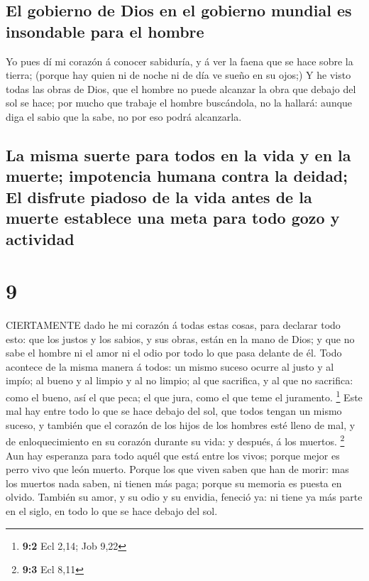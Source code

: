 \hypertarget{el-gobierno-de-dios-en-el-gobierno-mundial-es-insondable-para-el-hombre}{%
\subsection{El gobierno de Dios en el gobierno mundial es insondable
para el
hombre}\label{el-gobierno-de-dios-en-el-gobierno-mundial-es-insondable-para-el-hombre}}

 Yo pues dí mi corazón á conocer sabiduría, y á ver la
faena que se hace sobre la tierra; (porque hay quien ni de noche ni de
día ve sueño en su ojos;)  Y he visto todas las obras de
Dios, que el hombre no puede alcanzar la obra que debajo del sol se
hace; por mucho que trabaje el hombre buscándola, no la hallará: aunque
diga el sabio que la sabe, no por eso podrá alcanzarla.

\hypertarget{la-misma-suerte-para-todos-en-la-vida-y-en-la-muerte-impotencia-humana-contra-la-deidad-el-disfrute-piadoso-de-la-vida-antes-de-la-muerte-establece-una-meta-para-todo-gozo-y-actividad}{%
\subsection{La misma suerte para todos en la vida y en la muerte;
impotencia humana contra la deidad; El disfrute piadoso de la vida antes
de la muerte establece una meta para todo gozo y
actividad}\label{la-misma-suerte-para-todos-en-la-vida-y-en-la-muerte-impotencia-humana-contra-la-deidad-el-disfrute-piadoso-de-la-vida-antes-de-la-muerte-establece-una-meta-para-todo-gozo-y-actividad}}

\hypertarget{section-8}{%
\section{9}\label{section-8}}

 CIERTAMENTE dado he mi corazón á todas estas cosas, para
declarar todo esto: que los justos y los sabios, y sus obras, están en
la mano de Dios; y que no sabe el hombre ni el amor ni el odio por todo
lo que pasa delante de él.  Todo acontece de la misma manera
á todos: un mismo suceso ocurre al justo y al impío; al bueno y al
limpio y al no limpio; al que sacrifica, y al que no sacrifica: como el
bueno, así el que peca; el que jura, como el que teme el juramento.
\footnote{\textbf{9:2} Ecl 2,14; Job 9,22}  Este mal hay
entre todo lo que se hace debajo del sol, que todos tengan un mismo
suceso, y también que el corazón de los hijos de los hombres esté lleno
de mal, y de enloquecimiento en su corazón durante su vida: y después, á
los muertos. \footnote{\textbf{9:3} Ecl 8,11}  Aun hay
esperanza para todo aquél que está entre los vivos; porque mejor es
perro vivo que león muerto.  Porque los que viven saben que
han de morir: mas los muertos nada saben, ni tienen más paga; porque su
memoria es puesta en olvido.  También su amor, y su odio y
su envidia, feneció ya: ni tiene ya más parte en el siglo, en todo lo
que se hace debajo del sol.

